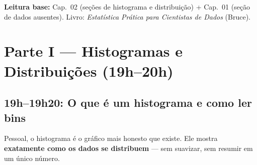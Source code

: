 \begin{NoteBox}
\textbf{Leitura base:} Cap.\ 02 (seções de histograma e distribuição) + Cap.\ 01
(seção de dados ausentes). Livro: \textit{Estatística Prática para Cientistas de Dados} (Bruce).
\end{NoteBox}

\section{Parte I — Histogramas e Distribuições (19h–20h)}

\subsection{19h–19h20: O que é um histograma e como ler bins}

Pessoal, o histograma é o gráfico mais honesto que existe. Ele mostra
\textbf{exatamente como os dados se distribuem} — sem suavizar, sem resumir
em um único número.

